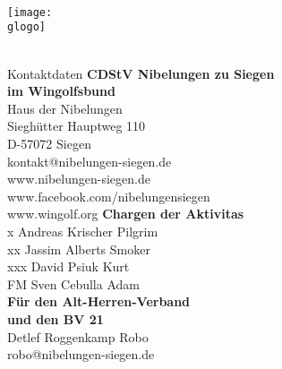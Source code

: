 \newcommand \gvierteSeiteTitel {Kontaktdaten}

\newcommand \gvierteSeite {
	\textbf{CDStV Nibelungen zu Siegen\\im Wingolfsbund}\\
	Haus der Nibelungen\\
	Sieghütter Hauptweg 110\\
	D-57072 Siegen \\
	kontakt@nibelungen-siegen.de\\
	www.nibelungen-siegen.de\\
	www.facebook.com/nibelungensiegen\\
	www.wingolf.org
	\vfill
	\textbf{Chargen der Aktivitas}\\
	\setlength\parindent{24pt}
	x	Andreas Krischer \vulgo Pilgrim\\
	xx	Jassim Alberts \vulgo Smoker\\
	xxx	David Psiuk \vulgo Kurt\\
	FM	Sven Cebulla \vulgo Adam\\
	\setlength\parindent{0pt}
	\vfill
	\textbf{Für den Alt-Herren-Verband\\und den BV 21}\\
	Detlef Roggenkamp \vulgo Robo\\
	robo@nibelungen-siegen.de\\
} 




\newcommand \lersteSeite {
		
		\gorga \\
		{\fontsize {\gsgL}{\dls} \selectfont \gorgb} \\
		\gorgc \\	
		\texttt{[image: \\glogo]}
		{\fontsize {\gsgL}{\dls} \selectfont \gsempro} \\
		\gsem \\
}

\neueSeite
	{\ohneKopzeile}
	{\zentriert}
	{\ohneTitel}
	{\lersteSeite}	


\neueSeite
	{\mitKopfzeile}
	{\linksbuending}
	{\gzweiteSeiteTitel}
	{\gzweiteSeite}
	

\neueSeite
	{\mitKopfzeile}
	{\linksbuending}
	{\gdritteSeiteTitel}
	{\gdritteSeite}
	

\neueSeite
	{\mitKopfzeile}
	{\linksbuending}
	{\gvierteSeiteTitel}
	{\gvierteSeite}
